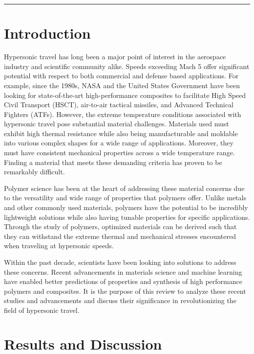 \documentclass[12pt]{article}
\begin{document}
\vspace{1em}
\hrule height 1pt

\begin{multicols}{2}

\section{Introduction}

\indent Hypersonic travel has long been a major point of interest in the aerospace industry and scientific community alike. Speeds exceeding Mach 5 offer significant potential with respect to both commercial and defense based applications. For example, since the 1980s, NASA and the United States Government have been looking for state-of-the-art high-performance composites to facilitate High Speed Civil Transport (HSCT), air-to-air tactical missiles, and Advanced Technical Fighters (ATFs). \citep{Lau2014} However, the extreme temperature conditions associated with hypersonic travel pose substantial material challenges. Materials used must exhibit high thermal resistance while also being manufacturable and moldable into various complex shapes for a wide range of applications. Moreover, they must have consistent mechanical properties across a wide temperature range. Finding a material that meets these demanding criteria has proven to be remarkably difficult.
	
\indent Polymer science has been at the heart of addressing these material concerns due to the versatility and wide range of properties that polymers offer. Unlike metals and other commonly used materials, polymers have the potential to be incredibly lightweight solutions while also having tunable properties for specific applications. Through the study of polymers, optimized materials can be derived such that they can withstand the extreme thermal and mechanical stresses encountered when traveling at hypersonic speeds. 

\indent Within the past decade, scientists have been looking into solutions to address these concerns. Recent advancements in materials science and machine learning have enabled better predictions of properties and synthesis of high performance polymers and composites. It is the purpose of this review to analyze these recent studies and advancements and discuss their significance in revolutionizing the field of hypersonic travel.
	
\section{Results and Discussion}


\end{multicols}
\end{document}

